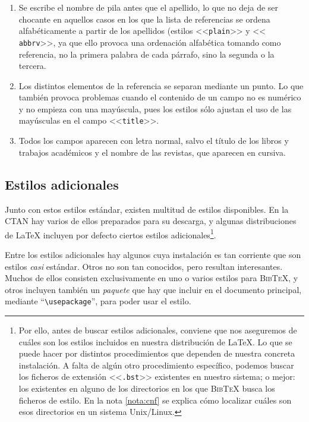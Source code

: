 \documentclass[a4paper,11pt]{article}
\def\btx-{\textsc{Bib\TeX}}
\def\ltx-{\LaTeX}
\def\ltr#1-{<<\texttt{#1}>>}
\def\tpf#1-{\ltr.#1-}
\def\cmd#1-{``\texttt{\textbackslash#1}''}
\begin{document}
\begin{enumerate}

\item Se escribe  el nombre de pila antes  que el apellido, lo que  no deja de
  ser chocante en aquellos casos en  los que la lista de referencias se ordena
  alfabéticamente  a partir  de  los  apellidos (estilos  \ltr  plain- y  \ltr
  abbrv-,  ya  que  ello   provoca  una  ordenación  alfabética  tomando  como
  referencia, no  la primera  palabra de  cada párrafo, sino  la segunda  o la
  tercera.

\item Los distintos  elementos de la referencia se  separan mediante un punto.
  Lo  que también  provoca problemas  cuando el  contenido de  un campo  no es
  numérico y  no empieza con una  mayúscula, pues los estilos  sólo ajustan el
  uso de las mayúsculas en el campo \ltr title-.

\item  Todos los  campos aparecen  con letra  normal, salvo  el título  de los
  libros y  trabajos académicos y el  nombre de las revistas,  que aparecen en
  cursiva.

\end{enumerate}

\subsection{Estilos adicionales}
\label{sec:estilos-adicionales}

Junto con estos estilos estándar,  existen multitud de estilos disponibles. En
la  CTAN  hay  varios  de   ellos  preparados  para  su  descarga,  y  algunas
distribuciones    de   \ltx-    incluyen   por    defecto    ciertos   estilos
adicionales\footnote{Por ello,  antes de buscar  estilos adicionales, conviene
  que  nos  aseguremos  de  cuáles   son  los  estilos  incluidos  en  nuestra
  distribución de  \ltx-. Lo que  se puede hacer por  distintos procedimientos
  que  dependen  de  nuestra  concreta  instalación. A  falta  de  algún  otro
  procedimiento específico, podemos buscar los ficheros de extensión \tpf bst-
  existentes  en nuestro sistema;  o mejor:  los existentes  en alguno  de los
  directorios  en los  que \btx-  busca los  ficheros de  estilo.  En  la nota
  \ref{nota:cnf} se explica  cómo localizar cuáles son esos  directorios en un
  sistema Unix/Linux.}.

Entre los  estilos adicionales hay  algunos cuya instalación es  tan corriente
que  son estilos  \emph{casi}  estándar.   Otros no  son  tan conocidos,  pero
resultan  interesantes.  Muchos  de ellos  consisten exclusivamente  en  uno o
varios estilos para \btx-, y  otros incluyen también un \emph{paquete} que hay
que incluir en  el documento principal, mediante \cmd  usepackage-, para poder
usar el estilo.
\end{document}
